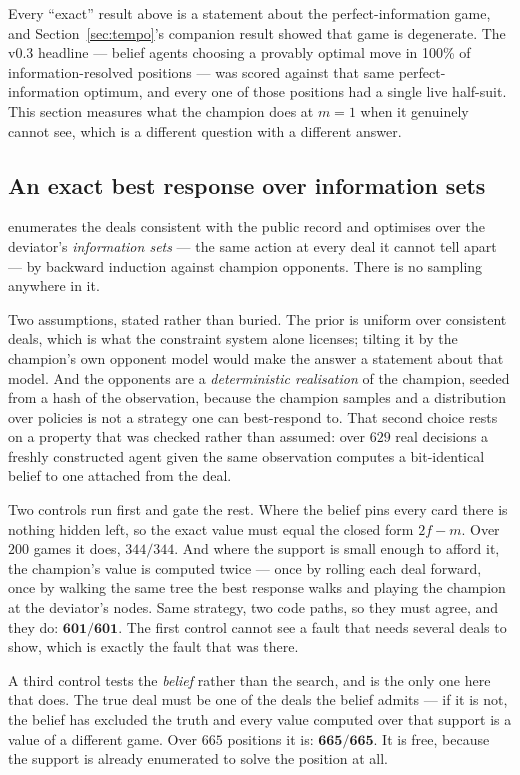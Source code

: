 \documentclass[11pt,a4paper]{article}
\begin{document}
Every ``exact'' result above is a statement about the perfect-information game,
and Section~\ref{sec:tempo}'s companion result showed that game is degenerate.
The v0.3 headline --- belief agents choosing a provably optimal move in 100\%
of information-resolved positions --- was scored against that same
perfect-information optimum, and every one of those positions had a single live
half-suit. This section measures what the champion does at $m = 1$ when it
genuinely cannot see, which is a different question with a different answer.

\subsection{An exact best response over information sets}

 enumerates the deals consistent with the public record
and optimises over the deviator's \emph{information sets} --- the same action
at every deal it cannot tell apart --- by backward induction against champion
opponents. There is no sampling anywhere in it.

Two assumptions, stated rather than buried. The prior is uniform over
consistent deals, which is what the constraint system alone licenses; tilting
it by the champion's own opponent model would make the answer a statement about
that model. And the opponents are a \emph{deterministic realisation} of the
champion, seeded from a hash of the observation, because the champion samples
and a distribution over policies is not a strategy one can best-respond to.
That second choice rests on a property that was checked rather than assumed:
over $629$ real decisions a freshly constructed agent given the same
observation computes a bit-identical belief to one attached from the deal.

Two controls run first and gate the rest. Where the belief pins every card
there is nothing hidden left, so the exact value must equal the closed form
$2f - m$. Over $200$ games it does, \textbf{$344/344$}. And where the support
is small enough to afford it, the champion's value is computed twice --- once
by rolling each deal forward, once by walking the same tree the best response
walks and playing the champion at the deviator's nodes. Same strategy, two code
paths, so they must agree, and they do: $\mathbf{601/601}$. The first control
cannot see a fault that needs several deals to show, which is exactly the fault
that was there.

A third control tests the \emph{belief} rather than the search, and is the only
one here that does. The true deal must be one of the deals the belief admits ---
if it is not, the belief has excluded the truth and every value computed over
that support is a value of a different game. Over $665$ positions it is: $\mathbf{665/665}$. It is free, because the
support is already enumerated to solve the position at all.
\end{document}
